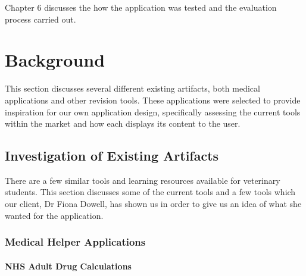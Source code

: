 \documentclass{l3proj}
\begin{document}
Chapter 6 discusses the how the application was tested and the evaluation process carried out.

\chapter{Background}
\label{background}

This section discusses several different existing artifacts, both medical applications and other revision tools. These applications were selected to provide inspiration for our own application design, specifically assessing the current tools within the market and how each displays its content to the user.

\section{Investigation of Existing Artifacts}


There are a few similar tools and learning resources available for veterinary students. This section discusses some of the current tools and a few tools which our client, Dr Fiona Dowell, has shown us in order to give us an idea of what she wanted for the application.

\subsection{Medical Helper Applications}


\subsubsection{NHS Adult Drug Calculations}
\end{document}
